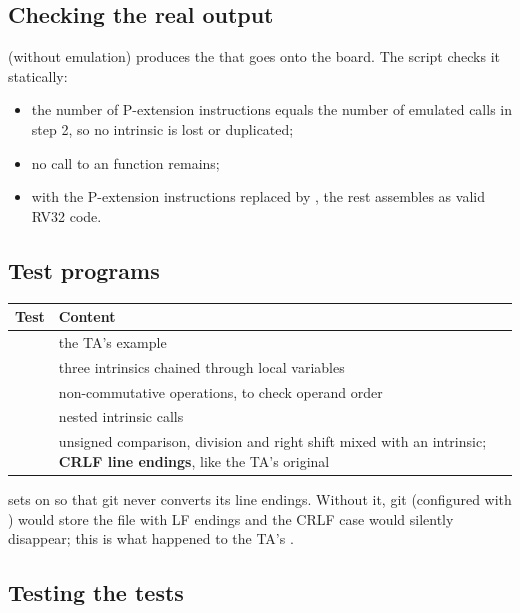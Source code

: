 \documentclass[12pt]{article}
\begin{document}
\subsection{Checking the real output}

 (without emulation) produces the  that goes onto the board. The script
checks it statically:


\begin{itemize}
  \item the number of P-extension instructions equals the number of emulated calls in step 2, so no
        intrinsic is lost or duplicated;
  \item no call to an  function remains;
  \item with the P-extension instructions replaced by , the rest assembles as valid RV32 code.
\end{itemize}

\subsection{Test programs}

\begin{center}
\begin{tabularx}{\linewidth}{@{}lL@{}}
\toprule
Test & Content \\
\midrule
{} & the TA's example \\
 & three intrinsics chained through local variables \\
 & non-commutative operations, to check operand order \\
 & nested intrinsic calls \\
 & unsigned comparison, division and right shift mixed with an intrinsic; \textbf{CRLF line endings}, like the TA's original  \\
\bottomrule
\end{tabularx}
\end{center}

 sets  on  so that git never converts its line endings. Without
it, git (configured with ) would store the file with LF endings and the CRLF case
would silently disappear; this is what happened to the TA's .

\subsection{Testing the tests}
\end{document}
